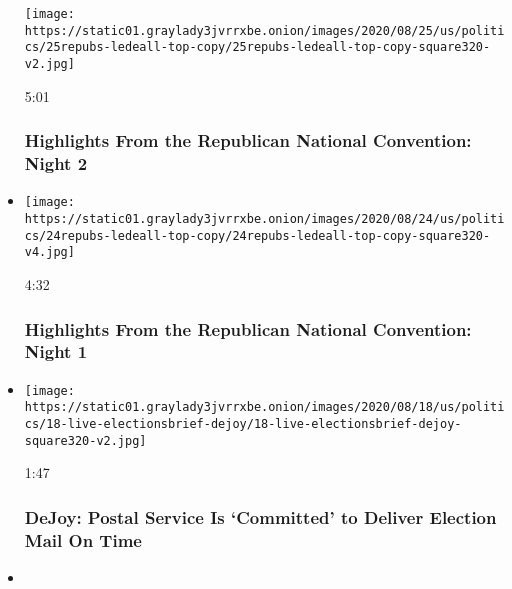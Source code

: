 \begin{itemize}
  \texttt{[image: https://static01.graylady3jvrrxbe.onion/images/2020/08/25/us/politics/25repubs-ledeall-top-copy/25repubs-ledeall-top-copy-square320-v2.jpg]}

  5:01

  \hypertarget{highlights-from-the-republican-national-convention-night-2}{%
  \subsubsection{Highlights From the Republican National Convention:
  Night
  2}\label{highlights-from-the-republican-national-convention-night-2}}
\item
  \href{https://www.nytimes3xbfgragh.onion/video/us/politics/100000007305412/republican-national-convention-highlights.html?action=click\&module=video-series-bar\&region=header\&pgtype=Article\&playlistId=video/us-politics}{}

  \texttt{[image: https://static01.graylady3jvrrxbe.onion/images/2020/08/24/us/politics/24repubs-ledeall-top-copy/24repubs-ledeall-top-copy-square320-v4.jpg]}

  4:32

  \hypertarget{highlights-from-the-republican-national-convention-night-1}{%
  \subsubsection{Highlights From the Republican National Convention:
  Night
  1}\label{highlights-from-the-republican-national-convention-night-1}}
\item
  \href{https://www.nytimes3xbfgragh.onion/video/us/politics/100000007300635/postmaster-general-dejoy-testifies-video.html?action=click\&module=video-series-bar\&region=header\&pgtype=Article\&playlistId=video/us-politics}{}

  \texttt{[image: https://static01.graylady3jvrrxbe.onion/images/2020/08/18/us/politics/18-live-electionsbrief-dejoy/18-live-electionsbrief-dejoy-square320-v2.jpg]}

  1:47

  \hypertarget{dejoy-postal-service-is-committed-to-deliver-election-mail-on-time}{%
  \subsubsection{DeJoy: Postal Service Is `Committed' to Deliver
  Election Mail On
  Time}\label{dejoy-postal-service-is-committed-to-deliver-election-mail-on-time}}
\item
  \href{https://www.nytimes3xbfgragh.onion/video/us/100000007282044/biden-speech-video.html?action=click\&module=video-series-bar\&region=header\&pgtype=Article\&playlistId=video/us-politics}{}


\end{itemize}
